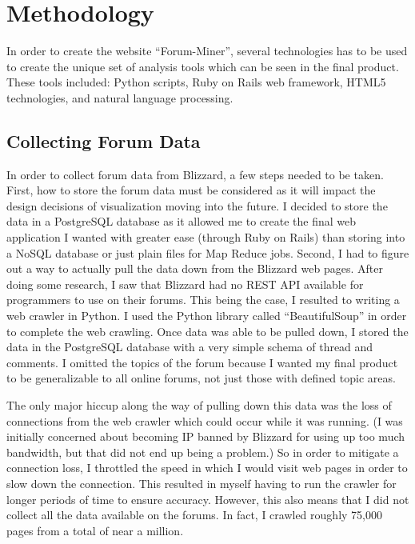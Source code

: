 \documentclass[conference]{IEEEtran}
\begin{document}
\section{Methodology}
\label{sec:meth}

In order to create the website ``Forum-Miner'', several technologies has to be used to create
the unique set of analysis tools which can be seen in the final product. These tools included: Python scripts,
Ruby on Rails web framework, HTML5 technologies, and natural language processing.

\subsection{Collecting Forum Data}

In order to collect forum data from Blizzard, a few steps needed to be taken. First, how to store the forum
data must be considered as it will impact the design decisions of visualization moving into the future. I decided
to store the data in a PostgreSQL database as it allowed me to create the final web application I wanted with
greater ease (through Ruby on Rails) than storing into a NoSQL database or just plain files for Map Reduce jobs.
Second, I had to figure out a way to actually pull the data down from the Blizzard web pages. After doing some
research, I saw that Blizzard had no REST API available for programmers to use on their forums. This being
the case, I resulted to writing a web crawler in Python. I used the Python library called ``BeautifulSoup'' in
order to complete the web crawling. Once data was able to be pulled down, I stored the data in the PostgreSQL 
database with a very simple schema of thread and comments. I omitted the topics of the forum because I wanted
my final product to be generalizable to all online forums, not just those with defined topic areas.

The only major hiccup along the way of pulling down this data was the loss of connections from the web crawler
which could occur while it was running. (I was initially concerned about becoming IP banned by Blizzard for
using up too much bandwidth, but that did not end up being a problem.) So in order to mitigate a connection loss,
I throttled the speed in which I would visit web pages in order to slow down the connection. This resulted in
myself having to run the crawler for longer periods of time to ensure accuracy. However, this also means that
I did not collect all the data available on the forums. In fact, I crawled roughly 75,000 pages from a total
of near a million.
\end{document}
